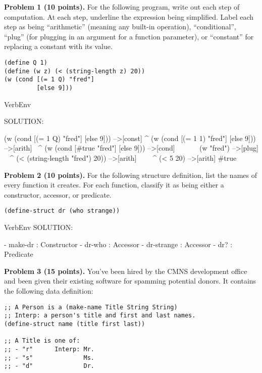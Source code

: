 \documentclass[12pt]{article}
\begin{document}
\newpage

\noindent
{\bf Problem 1 (10 points).}
%
For the following program, write out each step of computation. At each
step, underline the expression being simplified. Label each step as
being ``arithmetic'' (meaning any built-in operation),
``conditional'', ``plug'' (for plugging in an argument for a function
parameter), or ``constant'' for replacing a constant with its value.


\begin{verbatim}
(define Q 1)
(define (w z) (< (string-length z) 20))
(w (cond [(= 1 Q) "fred"]
         [else 9]))
\end{verbatim}


\begin{SaveVerbatim}{VerbEnv}  

SOLUTION:

(w (cond [(= 1 Q) "fred"] [else 9])) -->[const]
               ^
(w (cond [(= 1 1) "fred"] [else 9])) -->[arith]
          ^^^^^^^
(w (cond [#true "fred"] [else 9]))   -->[cond]
   ^^^^^^^^^^^^^^^^^^^^^^^^^^^^^^
(w "fred")                           -->[plug]
^^^^^^^^^^
(< (string-length "fred") 20))       -->[arith]
   ^^^^^^^^^^^^^^^^^^^^^^
(< 5 20)                             -->[arith]
#true
\end{SaveVerbatim}


\newpage

\noindent
{\bf Problem 2 (10 points).}
%
For the following structure definition, list the names of every
function it creates.  For each function, classify it as being either a
constructor, accessor, or predicate.

\begin{verbatim}
(define-struct dr (who strange))
\end{verbatim}

\begin{SaveVerbatim}{VerbEnv}  
SOLUTION:

- make-dr    : Constructor
- dr-who     : Accessor
- dr-strange : Accessor
- dr?        : Predicate
\end{SaveVerbatim}


\newpage

\noindent
{\bf Problem 3 (15 points).}
%
You've been hired by the CMNS development office and been given their
existing software for spamming potential donors.  It contains the following
data definition:
\begin{verbatim}
;; A Person is a (make-name Title String String)
;; Interp: a person's title and first and last names.
(define-struct name (title first last))

;; A Title is one of:
;; - "r"      Interp: Mr.
;; - "s"              Ms.
;; - "d"              Dr.
\end{verbatim}
\end{document}
